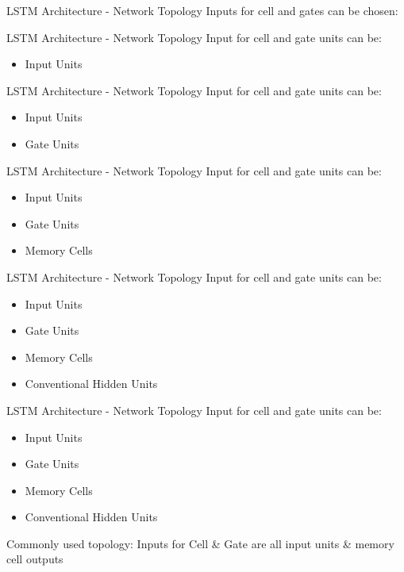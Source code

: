 \documentclass[10pt, aspectratio=169]{beamer}
\begin{document}
\begin{frame}[t]{LSTM Architecture - Network Topology}
Inputs for cell and gates can be chosen:
\end{frame}

\begin{frame}[t]{LSTM Architecture - Network Topology}
Input for cell and gate units can be:
\begin{itemize}
    \item Input Units
\end{itemize}
\end{frame}

\begin{frame}[t]{LSTM Architecture - Network Topology}
Input for cell and gate units can be:
\begin{itemize}
    \item Input Units
    \item Gate Units
\end{itemize}
\end{frame}

\begin{frame}[t]{LSTM Architecture - Network Topology}
Input for cell and gate units can be:
\begin{itemize}
    \item Input Units
    \item Gate Units
    \item Memory Cells
\end{itemize}
\end{frame}

\begin{frame}[t]{LSTM Architecture - Network Topology}
Input for cell and gate units can be:
\begin{itemize}
    \item Input Units
    \item Gate Units
    \item Memory Cells
    \item Conventional Hidden Units
\end{itemize}
\end{frame}

\begin{frame}[t]{LSTM Architecture - Network Topology}
Input for cell and gate units can be:
\begin{itemize}
    \item Input Units
    \item Gate Units
    \item Memory Cells
    \item Conventional Hidden Units
\end{itemize}
Commonly used topology: Inputs for Cell \& Gate are all input units \& memory cell outputs
\end{frame}
\end{document}
